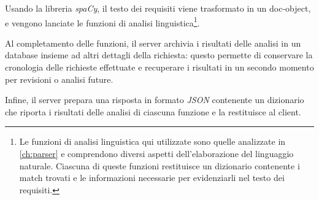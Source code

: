 \documentclass[12pt]{report}
\newcommand{\spacy}{\textsl{spaCy}\xspace}
\newcommand{\json}{\textsl{JSON}\xspace}
\begin{document}
Usando la libreria \spacy, il testo dei requisiti viene trasformato in un doc-object, e vengono lanciate le funzioni di analisi linguistica\footnote{Le funzioni di analisi linguistica qui utilizzate sono quelle analizzate in \cref{ch:parser} e comprendono diversi aspetti dell'elaborazione del linguaggio naturale. Ciascuna di queste funzioni restituisce un dizionario contenente i match trovati e le informazioni necessarie per evidenziarli nel testo dei requisiti.}.

Al completamento delle funzioni, il server archivia i risultati delle analisi in un database insieme ad altri dettagli della richiesta: questo permette di conservare la cronologia delle richieste effettuate e recuperare i risultati in un secondo momento per revisioni o analisi future.

Infine, il server prepara una risposta in formato \json contenente un dizionario che riporta i risultati delle analisi di ciascuna funzione e la restituisce al client.
\end{document}
